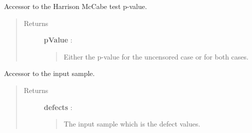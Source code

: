 \documentclass[letterpaper,10pt,english]{sphinxmanual}
\begin{document}
\begin{fulllineitems}

\begin{fulllineitems}
\label{_generated/otpod.UnivariateLinearModelAnalysis:otpod.UnivariateLinearModelAnalysis.getHarrisonMcCabePValue}
Accessor to the Harrison McCabe test p-value.
\begin{quote}\begin{description}
\item[{Returns}] \leavevmode
\textbf{pValue} : \href{http://doc.openturns.org/openturns-latest/sphinx/user\_manual/\_generated/openturns.NumericalPoint.html\#openturns.NumericalPoint}{}
\begin{quote}

Either the p-value for the uncensored case or for both cases.
\end{quote}

\end{description}\end{quote}

\end{fulllineitems}


\begin{fulllineitems}
\label{_generated/otpod.UnivariateLinearModelAnalysis:otpod.UnivariateLinearModelAnalysis.getInputSample}
Accessor to the input sample.
\begin{quote}\begin{description}
\item[{Returns}] \leavevmode
\textbf{defects} : \href{http://doc.openturns.org/openturns-latest/sphinx/user\_manual/\_generated/openturns.NumericalSample.html\#openturns.NumericalSample}{}
\begin{quote}

The input sample which is the defect values.
\end{quote}

\end{description}\end{quote}

\end{fulllineitems}



\end{fulllineitems}
\end{document}

